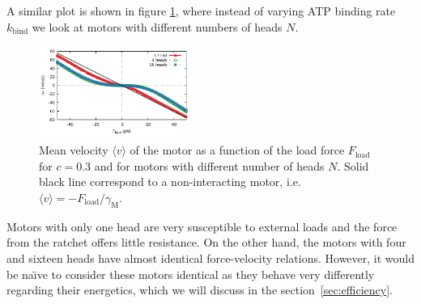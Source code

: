 \documentclass[aps,pre,twocolumn,showpacs,showkeys,superscriptaddress,floatfix]{revtex4-1}
\begin{document}
A similar plot is shown in figure \ref{fig:F_v_heads}, where instead of varying ATP binding rate $k_\text{bind}$ we look at motors with different numbers of heads $N$. 
\begin{figure}[t]
\centering
\includegraphics[width=0.45\textwidth,height=!]{F_v_heads}
\caption{
\label{fig:F_v_heads} 
Mean velocity $\langle v \rangle$ of the motor as a function of the load force $F_\text{load}$ for $c=0.3$ and for motors with different number of heads $N$.
Solid black line correspond to a non-interacting motor, i.e. $\langle v \rangle = - F_\text{load} / \gamma_\text{M}$. 
}
\end{figure}
Motors with only one head are very susceptible to external loads and the force from the ratchet offers little resistance. 
On the other hand, the motors with four and sixteen heads have almost identical force-velocity relations. 
However, it would be na\"{\i}ve to consider these motors identical as they behave very differently regarding their energetics,  
which we will discuss in the section~\ref{sec:efficiency}.
\end{document}
